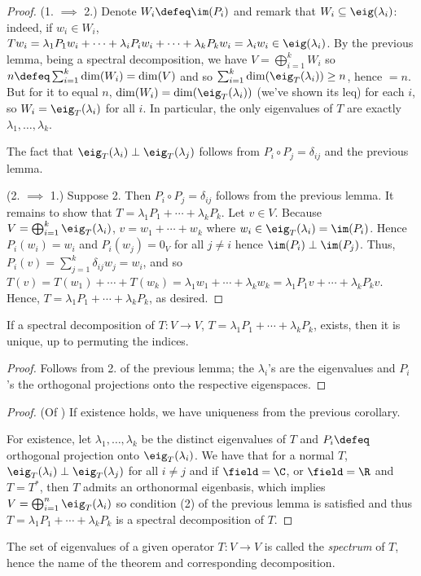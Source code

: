 \begin{proof}
    (1. $\implies$ 2.) Denote $W_i \defeq \im(P_i)$ and remark that $W_i \subseteq \eig(\lambda_i)$: indeed, if $w_i \in W_i$, $Tw_i= \lambda_1 P_1w_i+\cdots+\lambda_i P_iw_i+\cdots+\lambda_kP_kw_i = \lambda_i w_i \in \eig(\lambda_i)$. By the previous lemma, being a spectral decomposition, we have $V = \bigoplus_{i=1}^k W_i$ so $n \defeq \sum_{i=1}^k \dim(W_i) = \dim(V)$ and so $\sum_{i=1}^k \dim(\eig_T(\lambda_i)) \geq n$, hence $=n$. But for it to equal $n$, $\dim(W_i) = \dim(\eig_T(\lambda_i))$ (we've shown its leq) for each $i$, so $W_i = \eig_T(\lambda_i)$ for all $i$. In particular, the only eigenvalues of $T$ are exactly $\lambda_1, \dots, \lambda_k$.

    The fact that $\eig_T(\lambda_i) \perp \eig_T(\lambda_j)$ follows from $P_i \circ P_j = \delta_{ij}$ and the previous lemma.

    (2. $\implies$ 1.) Suppose 2. Then $P_i \circ P_j = \delta_{ij}$ follows from the previous lemma. It remains to show that $T = \lambda_1 P_1 + \cdots + \lambda_k P_k$. Let $v \in V$. Because $V = \bigoplus_{i=1}^k \eig_T(\lambda_i)$, $v = w_1 + \cdots + w_k$ where $w_i \in \eig_T(\lambda_i) = \im(P_i)$. Hence $P_i(w_i) = w_i$ and $P_i(w_j) = 0_V$ for all $j \neq i$ hence $\im(P_i) \perp \im(P_j)$. Thus, $P_i(v) = \sum_{j=1}^k \delta_{ij} w_j = w_i$, and so $T(v) = T(w_1) + \cdots + T(w_k) = \lambda_1 w_1 + \cdots + \lambda_k w_k = \lambda_1P_1v + \cdots + \lambda_k P_k v$. Hence, $T = \lambda_1 P_1 + \cdots + \lambda_k P_k$, as desired.
\end{proof}

\begin{corollary}
    If a spectral decomposition of $T : V \to V$, $T = \lambda_1 P_1 + \cdots + \lambda_k P_k$, exists, then it is unique, up to permuting the indices.
\end{corollary}

\begin{proof}
    Follows from 2. of the previous lemma; the $\lambda_i$'s are the eigenvalues and $P_i$'s the orthogonal projections onto the respective eigenspaces.
\end{proof}

\begin{proof}(Of )
    If existence holds, we have uniqueness from the previous corollary.

    For existence, let $\lambda_1, \dots, \lambda_k$ be the distinct eigenvalues of $T$ and $P_i \defeq$ orthogonal projection onto $\eig_T(\lambda_i)$. We have that for a normal $T$, $\eig_T(\lambda_i) \perp \eig_T(\lambda_j)$ for all $i \neq j$ and if $\field = \C$, or $\field = \R$ and $T = T^\ast$, then $T$ admits an orthonormal eigenbasis, which implies $V = \bigoplus_{i=1}^n \eig_T(\lambda_i)$ so condition (2) of the previous lemma is satisfied and thus $T = \lambda_1 P_1 + \cdots + \lambda_k P_k$ is a spectral decomposition of $T$.
\end{proof}

\begin{remark}
    The set of eigenvalues of a given operator $T : V \to V$ is called the \emph{spectrum} of $T$, hence the name of the theorem and corresponding decomposition.
\end{remark}

\begin{corollary}
\end{corollary}
